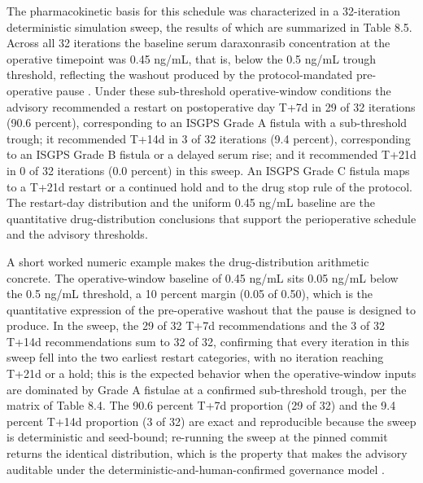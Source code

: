 The pharmacokinetic basis for this schedule was characterized in a 32-iteration
deterministic simulation sweep, the results of which are summarized in Table 8.5.
Across all 32 iterations the baseline serum daraxonrasib concentration at the
operative timepoint was 0.45 ng/mL, that is, below the 0.5 ng/mL trough
threshold, reflecting the washout produced by the protocol-mandated
pre-operative pause \cite{onpremwhippl}. Under these sub-threshold operative-window
conditions the advisory recommended a restart on postoperative day T+7d in 29 of
32 iterations (90.6 percent), corresponding to an ISGPS Grade A fistula with a
sub-threshold trough; it recommended T+14d in 3 of 32 iterations (9.4 percent),
corresponding to an ISGPS Grade B fistula or a delayed serum rise; and it
recommended T+21d in 0 of 32 iterations (0.0 percent) in this sweep. An ISGPS
Grade C fistula maps to a T+21d restart or a continued hold and to the drug
stop rule of the protocol. The restart-day distribution and the uniform 0.45
ng/mL baseline are the quantitative drug-distribution conclusions that support
the perioperative schedule and the advisory thresholds.

A short worked numeric example makes the drug-distribution arithmetic concrete.
The operative-window baseline of 0.45 ng/mL sits 0.05 ng/mL below the 0.5 ng/mL
threshold, a 10 percent margin (0.05 of 0.50), which is the quantitative
expression of the pre-operative washout that the pause is designed to produce. In
the sweep, the 29 of 32 T+7d recommendations and the 3 of 32 T+14d
recommendations sum to 32 of 32, confirming that every iteration in this sweep
fell into the two earliest restart categories, with no iteration reaching T+21d
or a hold; this is the expected behavior when the operative-window inputs are
dominated by Grade A fistulae at a confirmed sub-threshold trough, per the matrix
of Table 8.4. The 90.6 percent T+7d proportion (29 of 32) and the 9.4 percent
T+14d proportion (3 of 32) are exact and reproducible because the sweep is
deterministic and seed-bound; re-running the sweep at the pinned commit returns
the identical distribution, which is the property that makes the advisory
auditable under the deterministic-and-human-confirmed governance model
\cite{onpremwhippl,clintrustpai}.

